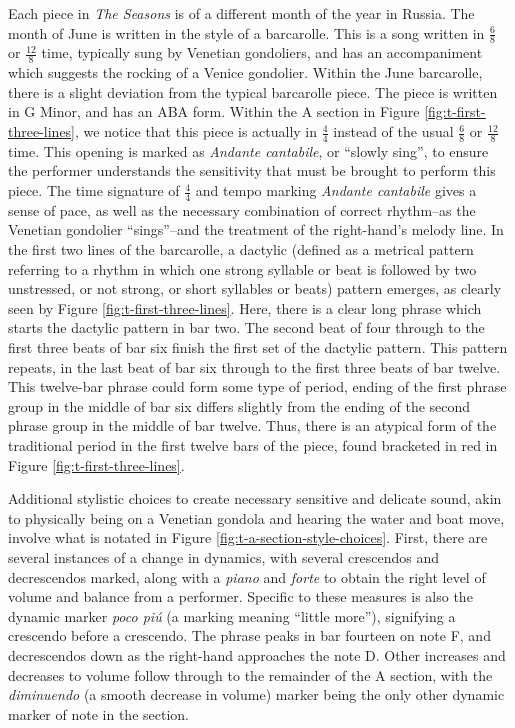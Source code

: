 Each piece in \textit{The Seasons} is of a different month of the year in Russia. The month of June is written in the style of a barcarolle. This is a song written in $\frac{6}{8}$ or $\frac{12}{8}$ time, typically sung by Venetian gondoliers, and has an accompaniment which suggests the rocking of a Venice gondolier\autocite{Latham_2011b}. Within the June barcarolle, there is a slight deviation from the typical barcarolle piece. The piece is written in G Minor, and has an ABA form. Within the A section in Figure \ref{fig:t-first-three-lines}, we notice that this piece is actually in $\frac{4}{4}$ instead of the usual $\frac{6}{8}$ or $\frac{12}{8}$ time. This opening is marked as \textit{Andante cantabile}, or ``slowly sing'', to ensure the performer understands the sensitivity that must be brought to perform this piece. The time signature of $\frac{4}{4}$ and tempo marking \textit{Andante cantabile} gives a sense of pace, as well as the necessary combination of correct rhythm--as the Venetian gondolier ``sings''--and the treatment of the right-hand's melody line. In the first two lines of the barcarolle, a dactylic (defined as a metrical pattern referring to a rhythm in which one strong syllable or beat is followed by two unstressed, or not strong, or short syllables or beats)\autocite{Cambridge_University_Press_Assessment} pattern emerges, as clearly seen by Figure \ref{fig:t-first-three-lines}\autocite{Henle_2002}. Here, there is a clear long phrase which starts the dactylic pattern in bar two. The second beat of four through to the first three beats of bar six finish the first set of the dactylic pattern. This pattern repeats, in the last beat of bar six through to the first three beats of bar twelve. This twelve-bar phrase could form some type of period, ending of the first phrase group in the middle of bar six differs slightly from the ending of the second phrase group in the middle of bar twelve. Thus, there is an atypical form of the traditional period in the first twelve bars of the piece, found bracketed in red in Figure \ref{fig:t-first-three-lines}\autocite{Henle_2002}. 

Additional stylistic choices to create necessary sensitive and delicate sound, akin to physically being on a Venetian gondola and hearing the water and boat move, involve what is notated in Figure \ref{fig:t-a-section-style-choices}\autocite{Henle_2002}. First, there are several instances of a change in dynamics, with several crescendos and decrescendos marked, along with a \textit{piano} and \textit{forte} to obtain the right level of volume and balance from a performer. Specific to these measures is also the dynamic marker \textit{poco piú} (a marking meaning ``little more''), signifying a crescendo before a crescendo. The phrase peaks in bar fourteen on note F, and decrescendos down as the right-hand approaches the note D. Other increases and decreases to volume follow through to the remainder of the A section, with the \textit{diminuendo} (a smooth decrease in volume) marker being the only other dynamic marker of note in the section.


